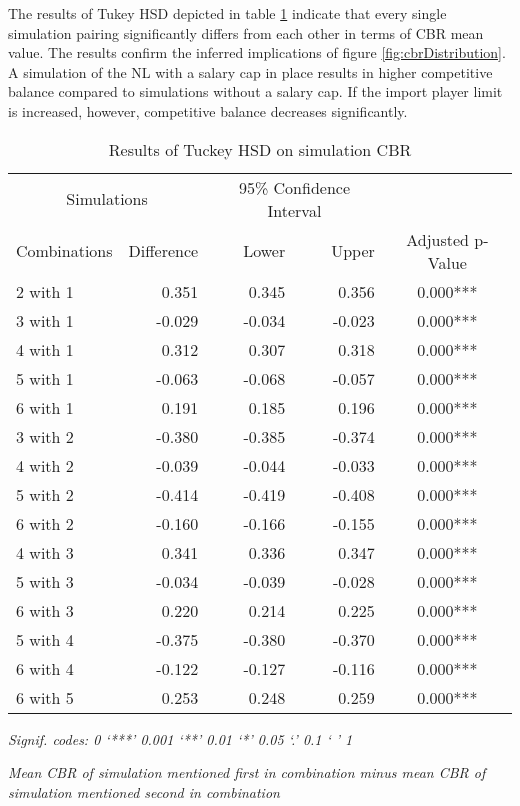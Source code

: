 \documentclass[12pt, a4paper]{article}
\begin{document}
\noindent
The results of Tukey HSD depicted in table \ref{table:cbrTukeyHSD} indicate that every single simulation pairing significantly differs from each other in terms of CBR mean value. The results confirm the inferred implications of figure \ref{fig:cbrDistribution}. A simulation of the NL with a salary cap in place results in higher competitive balance compared to simulations without a salary cap. If the import player limit is increased, however, competitive balance decreases significantly. 

\begin{table}[!ht]
    \centering
    \begin{threeparttable}
        \caption{Results of Tuckey HSD on simulation CBR}
        \label{table:cbrTukeyHSD}
        \begin{tabular}{lrrrc}
          \toprule
          \multicolumn{2}{c}{Simulations} & \multicolumn{2}{c}{95\% Confidence Interval} &  \\
          \cmidrule(lr){1-2} \cmidrule(lr){3-4}
          Combinations & Difference\tnote{1} & Lower & Upper & Adjusted p-Value \\ 
          \midrule
          2 with 1 &  0.351 & 0.345 & 0.356 & 0.000*** \\ 
          3 with 1 &  -0.029 & -0.034 & -0.023 & 0.000*** \\ 
          4 with 1 &  0.312 & 0.307 & 0.318 & 0.000*** \\ 
          5 with 1 &  -0.063 & -0.068 & -0.057 & 0.000*** \\ 
          6 with 1 &  0.191 & 0.185 & 0.196 & 0.000*** \\ 
          3 with 2 &  -0.380 & -0.385 & -0.374 & 0.000*** \\ 
          4 with 2 &  -0.039 & -0.044 & -0.033 & 0.000*** \\ 
          5 with 2 &  -0.414 & -0.419 & -0.408 & 0.000*** \\ 
          6 with 2 &  -0.160 & -0.166 & -0.155 & 0.000*** \\ 
          4 with 3 &  0.341 & 0.336 & 0.347 & 0.000*** \\ 
          5 with 3 &  -0.034 & -0.039 & -0.028 & 0.000*** \\ 
          6 with 3 &  0.220 & 0.214 & 0.225 & 0.000*** \\ 
          5 with 4 &  -0.375 & -0.380 & -0.370 & 0.000*** \\ 
          6 with 4 &  -0.122 & -0.127 & -0.116 & 0.000*** \\ 
          6 with 5 &  0.253 & 0.248 & 0.259 & 0.000*** \\  
          \bottomrule
        \end{tabular}
        \begin{tablenotes}[flushleft]
            \footnotesize
            \item \textit{Signif. codes:  0 ‘***’ 0.001 ‘**’ 0.01 ‘*’ 0.05 ‘.’ 0.1 ‘ ’ 1}
            \item[1] \textit{Mean CBR of simulation mentioned first in combination minus mean CBR of simulation mentioned second in combination}
        \end{tablenotes}
    \end{threeparttable}
\end{table} 
\end{document}
